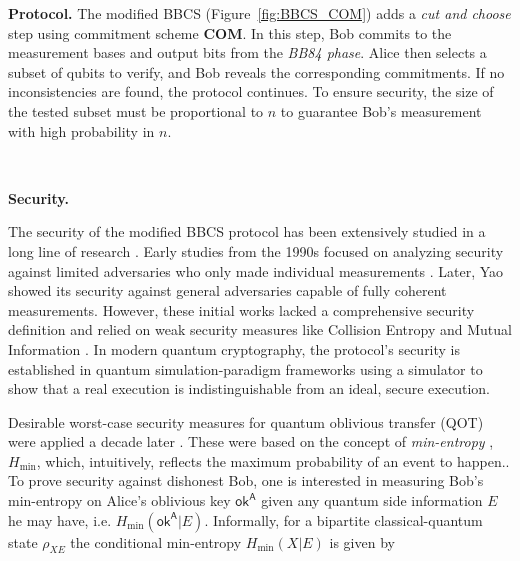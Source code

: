 \noindent\textbf{Protocol.} The modified BBCS (Figure~\ref{fig:BBCS_COM}) adds a \textit{cut and choose} step using commitment scheme \textbf{COM}. In this step, Bob commits to the measurement bases and output bits from the \textit{BB84 phase}. Alice then selects a subset of qubits to verify, and Bob reveals the corresponding commitments. If no inconsistencies are found, the protocol continues. To ensure security, the size of the tested subset must be proportional to $n$ to guarantee Bob's measurement with high probability in $n$.

\

\noindent\textbf{Security.} 

The security of the modified BBCS protocol has been extensively studied in a long line of research \cite{CK88, BBCS92, MS94, Y95, M96b, CDMS04, FS09, DFLSS09, U10, BF10, GLSV21, BCKM21}. Early studies from the 1990s focused on analyzing security against limited adversaries who only made individual measurements \cite{MS94}. Later, Yao \cite{Y95} showed its security against general adversaries capable of fully coherent measurements. However, these initial works \cite{MS94, Y95, M96b} lacked a comprehensive security definition and relied on weak security measures like Collision Entropy and Mutual Information \cite{BCC+10, TR11}. In modern quantum cryptography, the protocol's security is established in quantum simulation-paradigm frameworks \cite{FS09, U10, DFLSS09, KWW12} using a simulator to show that a real execution is indistinguishable from an ideal, secure execution.


Desirable worst-case security measures for quantum oblivious transfer (QOT) were applied a decade later \cite{R06, DFRSS07}. These were based on the concept of \textit{min-entropy} \cite{BCC+10,TR11}, $H_{\text{min}}$, which, intuitively, reflects the maximum probability of an event to happen.. To prove security against dishonest Bob, one is interested in measuring Bob's min-entropy on Alice's oblivious key $\mathsf{ok}^{\mathsf{A}}$ given any quantum side information $E$ he may have, i.e. $H_{\text{min}}(\mathsf{ok}^{\mathsf{A}} | E)$. Informally, for a bipartite classical-quantum state $\rho_{X E}$ the conditional min-entropy $H_{\text{min}}(X | E)$ is given by 

